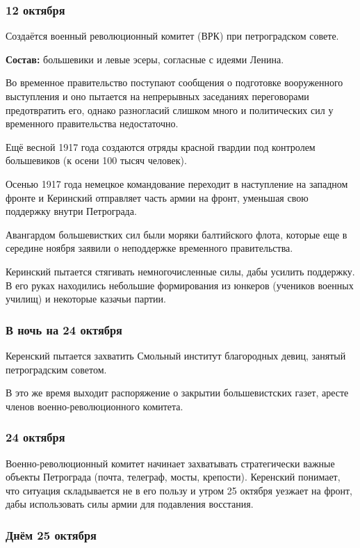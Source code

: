 \subsubsection{\textbf{12 октября}}
Создаётся военный революционный комитет (ВРК) при петроградском совете.

\textbf{Состав:} большевики и левые эсеры, согласные с идеями Ленина.

Во временное правительство поступают сообщения о подготовке вооруженного выступления и оно пытается на непрерывных заседаниях переговорами предотвратить его, однако разногласий слишком много и политических сил у временного правительства недостаточно. 

Ещё весной 1917 года создаются отряды красной гвардии под контролем большевиков (к осени 100 тысяч человек).

Осенью 1917 года немецкое командование переходит в наступление на западном фронте и Керинский отправляет часть армии на фронт, уменьшая свою поддержку внутри Петрограда. 

Авангардом большевистких сил были моряки балтийского флота, которые еще в середине ноября заявили о неподдержке временного правительства.

Керинский пытается стягивать немногочисленные силы, дабы усилить поддержку. В его руках находились небольшие формирования из юнкеров (учеников военных училищ) и некоторые казачьи партии.

\subsubsection{\textbf{В ночь на 24 октября}}

Керенский пытается захватить Смольный институт благородных девиц, занятый петроградским советом.

В это же время выходит распоряжение о закрытии большевистских газет, аресте членов военно-революционного комитета.

\subsubsection{\textbf{24 октября}}

Военно-революционный комитет начинает захватывать стратегически важные объекты Петрограда (почта, телеграф, мосты, крепости). Керенский понимает, что ситуация складывается не в его пользу и утром 25 октября уезжает на фронт, дабы использовать силы армии для подавления восстания.

\subsubsection{\textbf{Днём 25 октября}}

